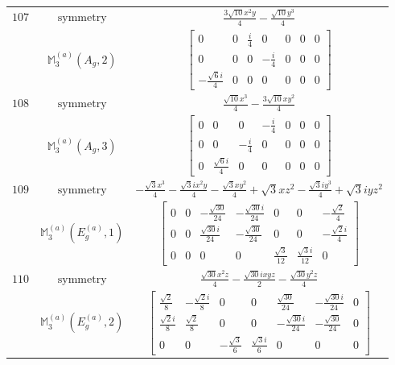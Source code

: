 \documentclass[fleqn,8pt,landscape]{jsarticle}
\begin{document}
\begin{longtable}{ccc}
$ 107 $ & $ \text{symmetry} $ & $ \frac{3 \sqrt{10} x^{2} y}{4} - \frac{\sqrt{10} y^{3}}{4} $ \\
$  $ & $ \mathbb{M}_{3}^{(a)}(A_{g},2) $ & $ \begin{bmatrix} 0 & 0 & \frac{i}{4} & 0 & 0 & 0 & 0 \\ 0 & 0 & 0 & - \frac{i}{4} & 0 & 0 & 0 \\ - \frac{\sqrt{6} i}{4} & 0 & 0 & 0 & 0 & 0 & 0 \end{bmatrix} $ \\ \hline
$ 108 $ & $ \text{symmetry} $ & $ \frac{\sqrt{10} x^{3}}{4} - \frac{3 \sqrt{10} x y^{2}}{4} $ \\
$  $ & $ \mathbb{M}_{3}^{(a)}(A_{g},3) $ & $ \begin{bmatrix} 0 & 0 & 0 & - \frac{i}{4} & 0 & 0 & 0 \\ 0 & 0 & - \frac{i}{4} & 0 & 0 & 0 & 0 \\ 0 & \frac{\sqrt{6} i}{4} & 0 & 0 & 0 & 0 & 0 \end{bmatrix} $ \\ \hline
$ 109 $ & $ \text{symmetry} $ & $ - \frac{\sqrt{3} x^{3}}{4} - \frac{\sqrt{3} i x^{2} y}{4} - \frac{\sqrt{3} x y^{2}}{4} + \sqrt{3} x z^{2} - \frac{\sqrt{3} i y^{3}}{4} + \sqrt{3} i y z^{2} $ \\
$  $ & $ \mathbb{M}_{3}^{(a)}(E_{g}^{(a)},1) $ & $ \begin{bmatrix} 0 & 0 & - \frac{\sqrt{30}}{24} & - \frac{\sqrt{30} i}{24} & 0 & 0 & - \frac{\sqrt{2}}{4} \\ 0 & 0 & \frac{\sqrt{30} i}{24} & - \frac{\sqrt{30}}{24} & 0 & 0 & - \frac{\sqrt{2} i}{4} \\ 0 & 0 & 0 & 0 & \frac{\sqrt{3}}{12} & \frac{\sqrt{3} i}{12} & 0 \end{bmatrix} $ \\ \hline
$ 110 $ & $ \text{symmetry} $ & $ \frac{\sqrt{30} x^{2} z}{4} - \frac{\sqrt{30} i x y z}{2} - \frac{\sqrt{30} y^{2} z}{4} $ \\
$  $ & $ \mathbb{M}_{3}^{(a)}(E_{g}^{(a)},2) $ & $ \begin{bmatrix} \frac{\sqrt{2}}{8} & - \frac{\sqrt{2} i}{8} & 0 & 0 & \frac{\sqrt{30}}{24} & - \frac{\sqrt{30} i}{24} & 0 \\ \frac{\sqrt{2} i}{8} & \frac{\sqrt{2}}{8} & 0 & 0 & - \frac{\sqrt{30} i}{24} & - \frac{\sqrt{30}}{24} & 0 \\ 0 & 0 & - \frac{\sqrt{3}}{6} & \frac{\sqrt{3} i}{6} & 0 & 0 & 0 \end{bmatrix} $ \\ \hline

\end{longtable}
\end{document}

